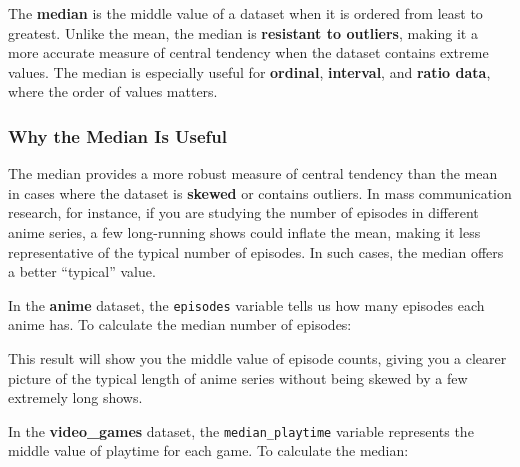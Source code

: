 \documentclass[
]{book}
\newenvironment{Shaded}{\begin{snugshade}}{\end{snugshade}}
\newcommand{\AttributeTok}[1]{\textcolor[rgb]{0.13,0.29,0.53}{#1}}
\newcommand{\CommentTok}[1]{\textcolor[rgb]{0.56,0.35,0.01}{\textit{#1}}}
\newcommand{\ConstantTok}[1]{\textcolor[rgb]{0.56,0.35,0.01}{#1}}
\newcommand{\FunctionTok}[1]{\textcolor[rgb]{0.13,0.29,0.53}{\textbf{#1}}}
\newcommand{\NormalTok}[1]{#1}
\newcommand{\OtherTok}[1]{\textcolor[rgb]{0.56,0.35,0.01}{#1}}
\newcommand{\SpecialCharTok}[1]{\textcolor[rgb]{0.81,0.36,0.00}{\textbf{#1}}}
\begin{document}
The \textbf{median} is the middle value of a dataset when it is ordered from least to greatest. Unlike the mean, the median is \textbf{resistant to outliers}, making it a more accurate measure of central tendency when the dataset contains extreme values. The median is especially useful for \textbf{ordinal}, \textbf{interval}, and \textbf{ratio data}, where the order of values matters.

\subsubsection*{Why the Median Is Useful}\label{why-the-median-is-useful}

The median provides a more robust measure of central tendency than the mean in cases where the dataset is \textbf{skewed} or contains outliers. In mass communication research, for instance, if you are studying the number of episodes in different anime series, a few long-running shows could inflate the mean, making it less representative of the typical number of episodes. In such cases, the median offers a better ``typical'' value.

In the \textbf{anime} dataset, the \texttt{episodes} variable tells us how many episodes each anime has. To calculate the median number of episodes:

\begin{Shaded}
\end{Shaded}

This result will show you the middle value of episode counts, giving you a clearer picture of the typical length of anime series without being skewed by a few extremely long shows.

In the \textbf{video\_games} dataset, the \texttt{median\_playtime} variable represents the middle value of playtime for each game. To calculate the median:

\begin{Shaded}
\end{Shaded}
\end{document}
